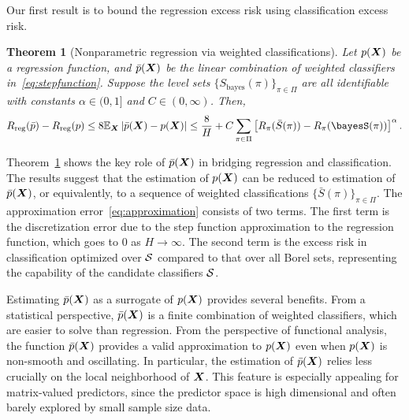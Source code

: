 \documentclass[12pt]{article}
\newtheorem{thm}{Theorem}[section]
\begin{document}
Our first result is to bound the regression excess risk using classification excess risk.
\begin{thm}[Nonparametric regression via weighted classifications]\label{thm:twobounds}Let $p(\bm X)$ be a regression function, and $\bar p(\bm X)$ be the linear combination of weighted classifiers in~\eqref{eq:stepfunction}. Suppose the level sets $\{S_{\text{bayes}}(\pi)\}_{\pi \in \Pi}$ are all identifiable with constants $\alpha\in(0,1]$ and $C\in(0,\infty)$. Then,
\begin{align}\label{eq:approximation}
R_{\textup{reg}}(\bar p) - R_{\textup{reg}}(p)\leq 8\mathbb{E}_{\mX}\left| \bar p(\mX)- p(\mX)\right|\leq {8\over H}+C\sum_{\pi\in \Pi}\left[ R_{\pi}(\bar S(\pi)) -R_{\pi}(\bayesS(\pi))\right]^{\alpha}.
\end{align}
\end{thm}
Theorem~\ref{thm:twobounds} shows the key role of $\bar p(\bm X)$ in bridging regression and classification. The results suggest that the estimation of $p(\bm X)$ can be reduced to estimation of $\bar p(\bm X)$, or equivalently, to a sequence of weighted classifications $\{\bar S(\pi)\}_{\pi\in\Pi}$. The approximation error~\eqref{eq:approximation} consists of two terms. The first term is the discretization error due to the step function approximation to the regression function, which goes to $0$ as $H\to \infty$. The second term is the excess risk in classification optimized over $\mathcal{S}$ compared to that over all Borel sets, representing the capability of the candidate classifiers $\mathcal{S}$. 

Estimating $\bar p(\bm X)$ as a surrogate of $p(\bm X)$ provides several benefits. From a statistical perspective, $\bar p(\bm X)$ is a finite combination of weighted classifiers, which are easier to solve than regression. From the perspective of functional analysis, the function $\bar p(\bm X)$ provides a valid approximation to $p(\bm X)$ even when $p(\bm X)$ is non-smooth and oscillating. In particular, the estimation of $\bar p(\bm X)$ relies less crucially on the local neighborhood of $\bm X$. This feature is especially appealing for matrix-valued predictors, since the predictor space is high dimensional and often barely explored by small sample size data.  
\end{document}
